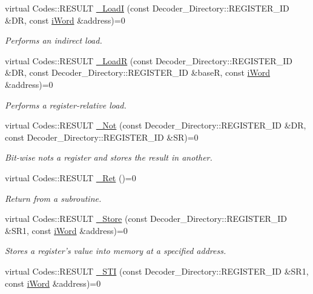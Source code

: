 \begin{DoxyCompactItemize}
virtual Codes::RESULT \hyperlink{classiWi11_a2a331ba57f78c203ba55fefde42cbc2b}{\_\-LoadI} (const Decoder\_\-Directory::REGISTER\_\-ID \&DR, const \hyperlink{classiWord}{iWord} \&address)=0
\begin{DoxyCompactList}\small\item\em Performs an indirect load. \item\end{DoxyCompactList}\item 
virtual Codes::RESULT \hyperlink{classiWi11_a29bb8d1f20ead4f5908c5505a06e5c57}{\_\-LoadR} (const Decoder\_\-Directory::REGISTER\_\-ID \&DR, const Decoder\_\-Directory::REGISTER\_\-ID \&baseR, const \hyperlink{classiWord}{iWord} \&address)=0
\begin{DoxyCompactList}\small\item\em Performs a register-\/relative load. \item\end{DoxyCompactList}\item 
virtual Codes::RESULT \hyperlink{classiWi11_a8925fab615cdc317ab256d514c23bc5e}{\_\-Not} (const Decoder\_\-Directory::REGISTER\_\-ID \&DR, const Decoder\_\-Directory::REGISTER\_\-ID \&SR)=0
\begin{DoxyCompactList}\small\item\em Bit-\/wise nots a register and stores the result in another. \item\end{DoxyCompactList}\item 
virtual Codes::RESULT \hyperlink{classiWi11_ae6c1048642dbf2c03c60062f6aaabfd2}{\_\-Ret} ()=0
\begin{DoxyCompactList}\small\item\em Return from a subroutine. \item\end{DoxyCompactList}\item 
virtual Codes::RESULT \hyperlink{classiWi11_aed4eb93ca7dd50a00dbed816a3ab2e28}{\_\-Store} (const Decoder\_\-Directory::REGISTER\_\-ID \&SR1, const \hyperlink{classiWord}{iWord} \&address)=0
\begin{DoxyCompactList}\small\item\em Stores a register's value into memory at a specified address. \item\end{DoxyCompactList}\item 
virtual Codes::RESULT \hyperlink{classiWi11_a1bd8c4396aa8f3d01b18e14083c25056}{\_\-STI} (const Decoder\_\-Directory::REGISTER\_\-ID \&SR1, const \hyperlink{classiWord}{iWord} \&address)=0

\end{DoxyCompactItemize}
